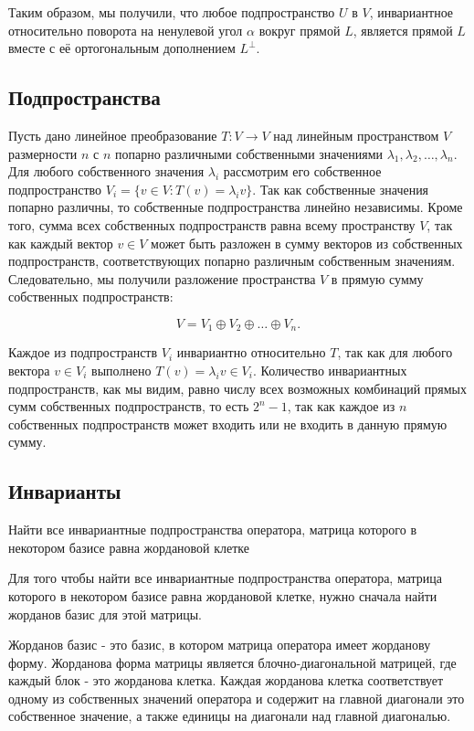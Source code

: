 Таким образом, мы получили, что любое подпространство $U$ в $V$, инвариантное относительно поворота на ненулевой
угол $\alpha$ вокруг прямой $L$, является прямой $L$ вместе с её ортогональным дополнением $L^{\perp}$.

 \subsection*{Подпространства}

Пусть дано линейное преобразование $T: V \rightarrow V$ над линейным пространством $V$ размерности $n$ с $n$
попарно различными собственными значениями $\lambda_1, \lambda_2, \dots, \lambda_n$.
Для любого собственного значения $\lambda_i$ рассмотрим его собственное подпространство $V_i = \{v \in V: T(v) = \lambda_i v\}$.
Так как собственные значения попарно различны, то собственные подпространства линейно независимы.
Кроме того, сумма всех собственных подпространств равна всему пространству $V$, так как каждый вектор $v \in V$
может быть разложен в сумму векторов из собственных подпространств, соответствующих попарно различным собственным
значениям.
Следовательно, мы получили разложение пространства $V$ в прямую сумму собственных подпространств:

\[V = V_1 \oplus V_2 \oplus \dots \oplus V_n.\]

Каждое из подпространств $V_i$ инвариантно относительно $T$, так как для любого вектора $v \in V_i$ выполнено $T(
v) = \lambda_i v \in V_i$.
Количество инвариантных подпространств, как мы видим, равно числу всех возможных комбинаций прямых сумм
собственных подпространств, то есть $2^n - 1$, так как каждое из $n$ собственных подпространств может входить или
не входить в данную прямую сумму.


 \subsection*{Инварианты}

Найти все инвариантные подпространства оператора, матрица которого в некотором базисе равна жордановой клетке

Для того чтобы найти все инвариантные подпространства оператора, матрица которого в некотором базисе равна
жордановой клетке, нужно сначала найти жорданов базис для этой матрицы.

Жорданов базис - это базис, в котором матрица оператора имеет жорданову форму.
Жорданова форма матрицы является блочно-диагональной матрицей, где каждый блок - это жорданова клетка.
Каждая жорданова клетка соответствует одному из собственных значений оператора и содержит на главной диагонали
это собственное значение, а также единицы на диагонали над главной диагональю.

